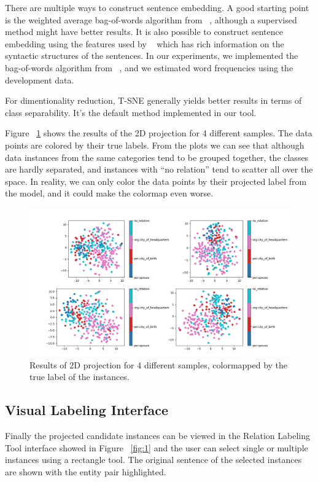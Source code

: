 \documentclass[11pt,a4paper]{article}
\begin{document}
	There are multiple ways to construct sentence embedding. A good starting point is the weighted average bag-of-words algorithm from ~\citet{arora2016simple}, although a supervised method might have better results. It is also possible to construct sentence embedding using the features used by ~\citet{surdeanu2012multi} which has rich information on the syntactic structures of the sentences. In our experiments, we implemented the bag-of-words algorithm from ~\citet{arora2016simple}, and we estimated word frequencies using the development data.
	
	For dimentionality reduction, T-SNE generally yields better results in terms of class separability. It's the default method implemented in our tool.
	
	Figure ~\ref{fig:2} shows the results of the 2D projection for 4 different samples. The data points are colored by their true labels. From the plots we can see that although data instances from the same categories tend to be grouped together, the classes are hardly separated, and instances with ``no relation'' tend to scatter all over the space. In reality, we can only color the data points by their projected label from the model, and it could make the colormap even worse.
	
\begin{figure}[!htbp]
  \includegraphics[width=\linewidth]{2.PNG}
  \caption{Results of 2D projection for 4 different samples, colormapped by the true label of the instances.}
  \label{fig:2}
\end{figure}

\subsection{Visual Labeling Interface}

Finally the projected candidate instances can be viewed in the Relation Labeling Tool interface showed in Figure ~\ref{fig:1} and the user can select single or multiple instances using a rectangle tool. The original sentence of the selected instances are shown with the entity pair highlighted. 
\end{document}
